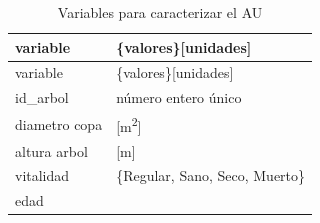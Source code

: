 \documentclass[12pt,a4paper,openany]{book}
\theoremstyle{definition}
\theoremstyle{definition}
\theoremstyle{definition}
\theoremstyle{remark}
\begin{document}
\begin{longtable}[]{@{}ll@{}}
\caption{\label{tab:vars-AU} Variables para caracterizar el
AU}\tabularnewline
\toprule
\begin{minipage}[b]{0.30\columnwidth}\raggedright\strut
variable\strut
\end{minipage} & \begin{minipage}[b]{0.42\columnwidth}\raggedright\strut
\{valores\}{[}unidades{]}\strut
\end{minipage}\tabularnewline
\midrule
\endfirsthead
\toprule
\begin{minipage}[b]{0.30\columnwidth}\raggedright\strut
variable\strut
\end{minipage} & \begin{minipage}[b]{0.42\columnwidth}\raggedright\strut
\{valores\}{[}unidades{]}\strut
\end{minipage}\tabularnewline
\midrule
\endhead
\begin{minipage}[t]{0.30\columnwidth}\raggedright\strut
id\_arbol\strut
\end{minipage} & \begin{minipage}[t]{0.42\columnwidth}\raggedright\strut
número entero único\strut
\end{minipage}\tabularnewline
\begin{minipage}[t]{0.30\columnwidth}\raggedright\strut
diametro copa\strut
\end{minipage} & \begin{minipage}[t]{0.42\columnwidth}\raggedright\strut
{[}m\textsuperscript{2}{]}\strut
\end{minipage}\tabularnewline
\begin{minipage}[t]{0.30\columnwidth}\raggedright\strut
altura arbol\strut
\end{minipage} & \begin{minipage}[t]{0.42\columnwidth}\raggedright\strut
{[}m{]}\strut
\end{minipage}\tabularnewline
\begin{minipage}[t]{0.30\columnwidth}\raggedright\strut
vitalidad\strut
\end{minipage} & \begin{minipage}[t]{0.42\columnwidth}\raggedright\strut
\{Regular, Sano, Seco, Muerto\}\strut
\end{minipage}\tabularnewline
\begin{minipage}[t]{0.30\columnwidth}\raggedright\strut
edad\strut
\end{minipage} & \begin{minipage}[t]{0.42\columnwidth}\raggedright\strut

\end{minipage}
\end{longtable}
\end{document}
